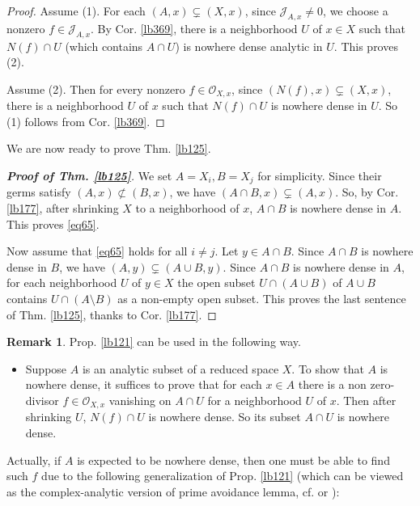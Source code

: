 \documentclass[12pt,b5paper,notitlepage]{report}
\theoremstyle{definition}
\newtheorem{rem}[df]{Remark}
\theoremstyle{plain}
\newcommand{\scr}{\mathscr}
\numberwithin{equation}{section}
\begin{document}
\begin{proof}
Assume (1). For each $(A,x)\subsetneq(X,x)$, since $\scr J_{A,x}\neq 0$, we choose a nonzero $f\in\scr J_{A,x}$. By Cor. \ref{lb369}, there is a neighborhood $U$ of $x\in X$ such that $N(f)\cap U$ (which contains $A\cap U$) is nowhere dense analytic in $U$. This proves (2).

Assume (2). Then for every nonzero $f\in\scr O_{X,x}$, since $(N(f),x)\subsetneq(X,x)$, there is a neighborhood $U$ of $x$ such that $N(f)\cap U$ is nowhere dense in $U$. So (1) follows from Cor. \ref{lb369}.
\end{proof}

We are now ready to prove Thm. \ref{lb125}.



\begin{proof}[\textbf{Proof of Thm. \ref{lb125}}]
We set $A=X_i,B=X_j$ for simplicity. Since their germs satisfy $(A,x)\nsubset(B,x)$, we have $(A\cap B,x)\subsetneq (A,x)$. So, by Cor. \ref{lb177}, after shrinking $X$ to a neighborhood of $x$, $A\cap B$ is nowhere dense in $A$. This proves \eqref{eq65}.

Now assume that \eqref{eq65} holds for all $i\neq j$. Let $y\in A\cap B$. Since $A\cap B$ is nowhere dense in $B$, we have  $(A,y)\subsetneq (A\cup B,y)$. Since $A\cap B$ is nowhere dense in $A$, for each neighborhood $U$ of $y\in X$ the open subset $U\cap (A\cup B)$ of $A\cup B$ contains $U\cap(A\setminus B)$ as a non-empty open subset. This proves the last sentence of Thm. \ref{lb125}, thanks to Cor. \ref{lb177}.
\end{proof}






\begin{rem}\label{lb122}
Prop. \ref{lb121} can be used in the following way. 
\begin{itemize}
\item Suppose $A$ is an analytic subset of a reduced space $X$. To show that $A$ is nowhere dense, it suffices to prove that for each $x\in A$ there is a non zero-divisor $f\in\scr O_{X,x}$ vanishing on $A\cap U$ for a neighborhood $U$ of $x$. Then after shrinking $U$, $N(f)\cap U$ is nowhere dense. So its subset $A\cap U$ is nowhere dense.
\end{itemize}
Actually, if $A$ is expected to be nowhere dense, then one must be able to find such $f$ due to the following generalization of Prop. \ref{lb121} (which can be viewed as the complex-analytic version of prime avoidance lemma, cf. \cite[Sec. 11.2]{Vak17} or \cite[Sec. 3.2]{Eis}):
\end{rem}
\end{document}
